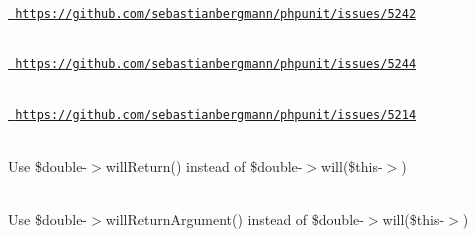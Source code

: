 \begin{DoxyRefList}
\label{deprecated__deprecated000051}%
%
\href{https://github.com/sebastianbergmann/phpunit/issues/5242}{\texttt{ https\+://github.\+com/sebastianbergmann/phpunit/issues/5242}}  
\item[Global \doxylink{class_p_h_p_unit_1_1_framework_1_1_test_case_a94ed50325eb367d1c1141efdcbbbd44c}{Test\+Case\+::get\+Object\+For\+Trait} (string \$trait\+Name, array \$arguments=\mbox{[}\mbox{]}, string \$trait\+Class\+Name=\textquotesingle{}\textquotesingle{}, bool \$call\+Original\+Constructor=true, bool \$call\+Original\+Clone=true, bool \$call\+Autoload=true)]\hfill \\
\label{deprecated__deprecated000053}%
%
\href{https://github.com/sebastianbergmann/phpunit/issues/5244}{\texttt{ https\+://github.\+com/sebastianbergmann/phpunit/issues/5244}}  
\item[Global \doxylink{class_p_h_p_unit_1_1_framework_1_1_test_case_a5d9f9a68ae51adadddf1d383fe9b34dc}{Test\+Case\+::ini\+Set} (string \$var\+Name, string \$new\+Value)]\hfill \\
\label{deprecated__deprecated000047}%
%
\href{https://github.com/sebastianbergmann/phpunit/issues/5214}{\texttt{ https\+://github.\+com/sebastianbergmann/phpunit/issues/5214}} 
\item[Global \doxylink{class_p_h_p_unit_1_1_framework_1_1_test_case_a5dbba3ebf8c740be8d3c9d811aa73fd5}{Test\+Case\+::on\+Consecutive\+Calls} (mixed ... \$arguments)]\hfill \\
\label{deprecated__deprecated000046}%
%
Use {\ttfamily \$double-\/\texorpdfstring{$>$}{>}will\+Return()} instead of {\ttfamily \$double-\/\texorpdfstring{$>$}{>}will(\$this-\/\texorpdfstring{$>$}{>})}  
\item[Global \doxylink{class_p_h_p_unit_1_1_framework_1_1_test_case_a2898e8fc5a7627f188fde3dc2c3c4db5}{Test\+Case\+::return\+Argument} (int \$argument\+Index)]\hfill \\
\label{deprecated__deprecated000043}%
%
Use {\ttfamily \$double-\/\texorpdfstring{$>$}{>}will\+Return\+Argument()} instead of {\ttfamily \$double-\/\texorpdfstring{$>$}{>}will(\$this-\/\texorpdfstring{$>$}{>})}  

\end{DoxyRefList}
